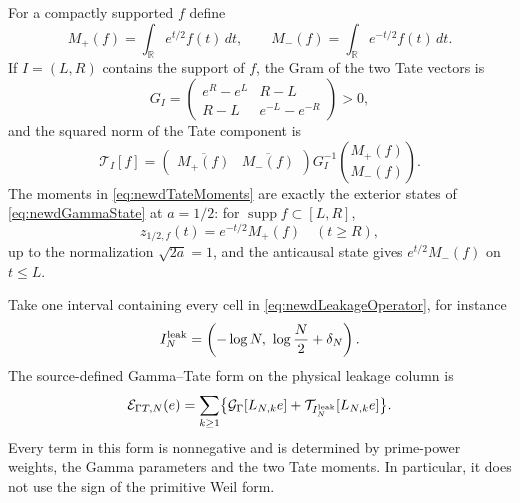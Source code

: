 \documentclass[11pt]{amsart}
\theoremstyle{definition}
\theoremstyle{remark}
\newcommand{\R}{\mathbb R}
\begin{document}
For a compactly supported $f$ define
\begin{equation}\label{eq:newdTateMoments}
 M_+(f)=\int_\R e^{t/2}f(t)\,dt,
 \qquad
 M_-(f)=\int_\R e^{-t/2}f(t)\,dt.
\end{equation}
If $I=(L,R)$ contains the support of $f$, the Gram of the two Tate vectors is
\begin{equation}\label{eq:newdExteriorTateGram}
 G_I=
 \begin{pmatrix}
 e^R-e^L&R-L\\
 R-L&e^{-L}-e^{-R}
 \end{pmatrix}>0,
\end{equation}
and the squared norm of the Tate component is
\begin{equation}\label{eq:newdTateTerminalForm}
 \mathcal T_I[f]=
 \begin{pmatrix}\overline{M_+(f)}&\overline{M_-(f)}\end{pmatrix}
 G_I^{-1}
 \binom{M_+(f)}{M_-(f)}.
\end{equation}
The moments in \eqref{eq:newdTateMoments} are exactly the exterior states of
\eqref{eq:newdGammaState} at $a=1/2$: for
$\operatorname{supp}f\subset[L,R]$,
\[
 z_{1/2,f}(t)=e^{-t/2}M_+(f)\quad(t\geq R),
\]
up to the normalization $\sqrt{2a}=1$, and the anticausal state gives
$e^{t/2}M_-(f)$ on $t\leq L$.

Take one interval containing every cell in
\eqref{eq:newdLeakageOperator}, for instance
\begin{equation}\label{eq:newdGlobalLeakageInterval}
 I_N^{\rm leak}=\left(-\log N,\ \log\frac N2+\delta_N\right).
\end{equation}
The source-defined Gamma--Tate form on the physical leakage column is
\begin{equation}\label{eq:newdGammaTateForm}
 \mathcal E_{\Gamma T,N}(e)=
 \sum_{k\geq1}
 \bigl\{\mathcal G_\Gamma[L_{N,k}e]
       +\mathcal T_{I_N^{\rm leak}}[L_{N,k}e]\bigr\}.
\end{equation}
Every term in this form is nonnegative and is determined by prime-power
weights, the Gamma parameters and the two Tate moments.  In particular, it
does not use the sign of the primitive Weil form.
\end{document}
